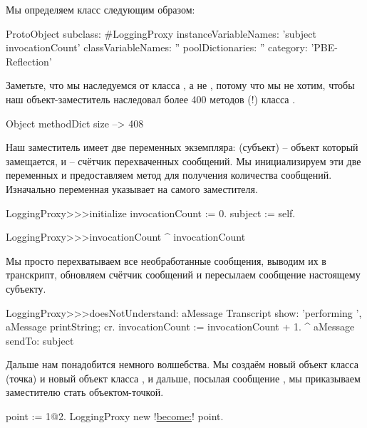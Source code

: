 \documentclass[a4paper,10pt,twoside]{book}
\begin{document}
Мы определяем класс  следующим образом:
\begin{code}{}
ProtoObject subclass: #LoggingProxy
	instanceVariableNames: 'subject invocationCount'
	classVariableNames: ''
	poolDictionaries: ''
	category: 'PBE-Reflection'
\end{code}
Заметьте, что мы наследуемся от класса , а не , потому что мы не хотим, чтобы наш объект-заместитель наследовал более 400 методов (!) класса .

\begin{code}{}
Object methodDict size --> 408
\end{code}

Наш заместитель имеет две переменных экземпляра:  (субъект) -- объект который замещается, и  -- счётчик перехваченных сообщений.
Мы инициализируем эти две переменных и предоставляем метод для получения количества сообщений.
Изначально переменная  указывает на самого заместителя.
\begin{code}{}
LoggingProxy>>>initialize
	invocationCount := 0.
	subject := self.
\end{code}

\begin{code}{}
LoggingProxy>>>invocationCount
	^ invocationCount
\end{code}

Мы просто перехватываем все необработанные сообщения, выводим их в транскрипт, обновляем счётчик сообщений и пересылаем сообщение настоящему субъекту.
\begin{code}{}
LoggingProxy>>>doesNotUnderstand: aMessage 
	Transcript show: 'performing ', aMessage printString; cr.
	invocationCount := invocationCount + 1.
	^ aMessage sendTo: subject
\end{code}

Дальше нам понадобится немного волшебства.
Мы создаём новый объект класса  (точка) и новый объект класса , и дальше, посылая сообщение , мы приказываем заместителю стать объектом-точкой.
\begin{code}{}
point := 1@2.
LoggingProxy new !\underline{become:}! point.
\end{code}
\end{document}
